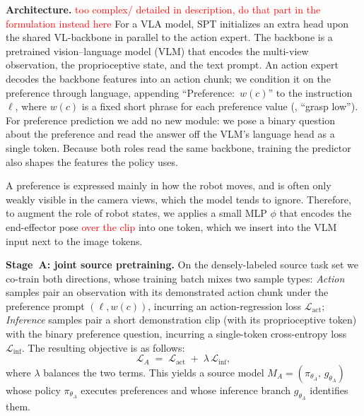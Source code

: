 \documentclass{article}
\begin{document}
\textbf{Architecture.}
\textcolor{red}{too complex/ detailed in description, do that part in the formulation instead here}
  For a VLA model, SPT initializes an extra head upon the shared VL-backbone in parallel to the action expert. 
  The backbone is a pretrained vision--language model (VLM) that encodes the multi-view observation, the proprioceptive state, and the text prompt. 
  An action expert decodes the backbone features into an action chunk; 
  we condition it on the preference through language, appending ``Preference:~$w(c)$'' to the instruction~$\ell$, where $w(c)$ is a fixed short
  phrase for each preference value (\eg, ``grasp low''). 
  For preference prediction we add no new module: we pose a binary question about the preference and read the answer off the VLM's language head as a single token. 
  Because both roles read the same backbone, training the predictor also shapes the features the policy uses.

  A preference is expressed mainly in how the robot moves, and is often only weakly visible in the camera views, which the model tends to ignore. Therefore, to augment the role of robot states, we applies a small MLP $\phi$ that encodes the end-effector pose \textcolor{red}{over the clip} into one token, which we insert into the VLM input next to the image tokens. 

\textbf{Stage~A: joint source pretraining.}
On the densely-labeled source task set we co-train both directions, whose training batch mixes two sample types:
\emph{Action} samples pair an observation with its demonstrated action chunk under the preference prompt $(\ell, w(c))$, incurring an action-regression loss $\mathcal{L}_{\mathrm{act}}$;
\emph{Inference} samples pair a short demonstration clip (with its proprioceptive token) with the binary preference question, incurring a single-token cross-entropy loss $\mathcal{L}_{\mathrm{inf}}$. 
The resulting objective is as follows:
\begin{equation}
  \mathcal{L}_{A} \;=\; \mathcal{L}_{\mathrm{act}} \;+\; \lambda\,\mathcal{L}_{\mathrm{inf}},
  \label{eq:stageA}
\end{equation}
where $\lambda$ balances the two terms. This yields a source model $M_A=(\pi_{\theta_A},\,g_{\theta_A})$ whose policy $\pi_{\theta_A}$ executes preferences and whose inference branch $g_{\theta_A}$ identifies them.
\end{document}
